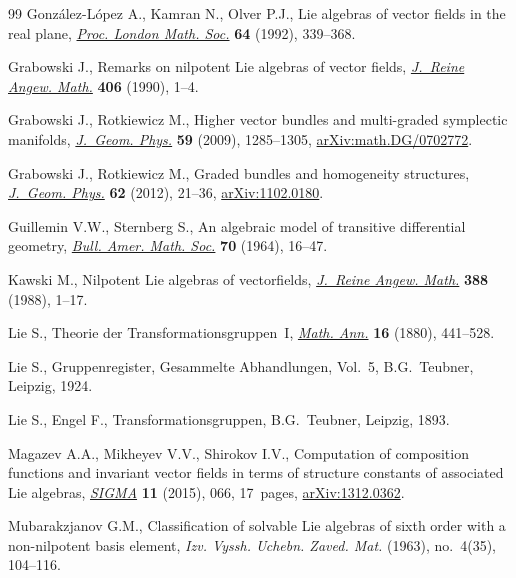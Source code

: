 \documentclass[pdftex]{sigma}
\numberwithin{equation}{section}
\begin{document}
\begin{thebibliography}{99}
Gonz\'alez-L\'opez A., Kamran N., Olver P.J., Lie algebras of vector fields in
 the real plane, \href{https://doi.org/10.1112/plms/s3-64.2.339}{\textit{Proc. London Math. Soc.}} \textbf{64} (1992), 339--368.

Grabowski J., Remarks on nilpotent {L}ie algebras of vector fields,
 \href{https://doi.org/10.1515/crll.1990.406.1}{\textit{J.~Reine Angew. Math.}} \textbf{406} (1990), 1--4.

Grabowski J., Rotkiewicz M., Higher vector bundles and multi-graded symplectic
 manifolds, \href{https://doi.org/10.1016/j.geomphys.2009.06.009}{\textit{J.~Geom. Phys.}} \textbf{59} (2009), 1285--1305,
 \href{https://arxiv.org/abs/math.DG/0702772}{arXiv:math.DG/0702772}.

Grabowski J., Rotkiewicz M., Graded bundles and homogeneity structures,
 \href{https://doi.org/10.1016/j.geomphys.2011.09.004}{\textit{J.~Geom. Phys.}} \textbf{62} (2012), 21--36, \href{https://arxiv.org/abs/1102.0180}{arXiv:1102.0180}.

Guillemin V.W., Sternberg S., An algebraic model of transitive differential
 geometry, \href{https://doi.org/10.1090/S0002-9904-1964-11019-3}{\textit{Bull. Amer. Math. Soc.}} \textbf{70} (1964), 16--47.

Kawski M., Nilpotent {L}ie algebras of vectorfields, \href{https://doi.org/10.1515/crll.1988.388.1}{\textit{J.~Reine Angew.
 Math.}} \textbf{388} (1988), 1--17.

Lie S., Theorie der Transformationsgruppen~{I}, \href{https://doi.org/10.1007/BF01446218}{\textit{Math. Ann.}} \textbf{16} (1880), 441--528.

Lie S., Gruppenregister, Gesammelte {A}bhandlungen, Vol.~{5}, B.G.~Teubner,
 Leipzig, 1924.

Lie S., Engel F., Transformationsgruppen, B.G.~Teubner, Leipzig, 1893.

Magazev A.A., Mikheyev V.V., Shirokov I.V., Computation of composition
 functions and invariant vector fields in terms of structure constants of
 associated {L}ie algebras, \href{https://doi.org/10.3842/SIGMA.2015.066}{\textit{SIGMA}} \textbf{11} (2015), 066, 17~pages,
 \href{https://arxiv.org/abs/1312.0362}{arXiv:1312.0362}.

Mubarakzjanov G.M., Classification of solvable {L}ie algebras of sixth order
 with a non-nilpotent basis element, \textit{Izv. Vyssh. Uchebn. Zaved. Mat.}
 (1963), no.~4(35), 104--116.


\end{thebibliography}
\end{document}
